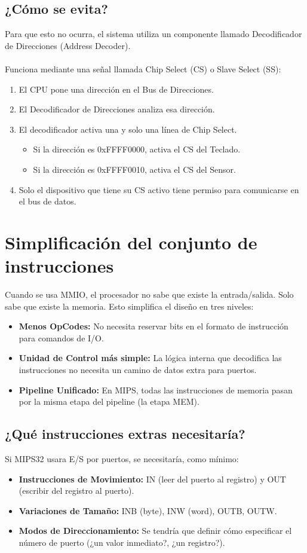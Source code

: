 \documentclass[]{article}
\begin{document}
	\subsection{¿Cómo se evita?}
		Para que esto no ocurra, el sistema utiliza un componente llamado Decodificador de Direcciones (Address Decoder).\\\\
		Funciona mediante una señal llamada Chip Select (CS) o Slave Select (SS):
		\begin{enumerate}
			\item El CPU pone una dirección en el Bus de Direcciones.
			\item El Decodificador de Direcciones analiza esa dirección.
			\item El decodificador activa una y solo una línea de Chip Select.
				\begin{itemize}
					\item Si la dirección es 0xFFFF0000, activa el CS del Teclado.
					\item Si la dirección es 0xFFFF0010, activa el CS del Sensor.
				\end{itemize}
			\item Solo el dispositivo que tiene su CS activo tiene permiso para comunicarse en el bus de datos.
		\end{enumerate}
		
\section{Simplificación del conjunto de instrucciones }
	Cuando se usa MMIO, el procesador no sabe que existe la entrada/salida. Solo
	 sabe que existe la memoria. Esto simplifica el diseño en tres niveles:
	\begin{itemize}
		\item \textbf{Menos OpCodes:} No necesita reservar bits  en el formato de instrucción para comandos de I/O.
		\item \textbf{Unidad de Control más simple:} La lógica interna que decodifica las instrucciones no necesita un camino de datos extra para puertos.
		\item \textbf{Pipeline Unificado:} En MIPS, todas las instrucciones de memoria pasan por la misma etapa del pipeline (la etapa MEM).
	\end{itemize}
	
	\subsection{¿Qué instrucciones extras necesitaría?}
		Si MIPS32 usara E/S por puertos, se necesitaría, como mínimo:
		\begin{itemize}
			\item \textbf{Instrucciones de Movimiento:} IN (leer del puerto al registro) y OUT (escribir del registro al puerto).
			\item \textbf{Variaciones de Tamaño:} INB (byte), INW (word), OUTB, OUTW.
			\item \textbf{Modos de Direccionamiento:} Se tendría que definir cómo especificar el número de puerto (¿un valor inmediato?, ¿un registro?).
		\end{itemize}
		
\end{document}
